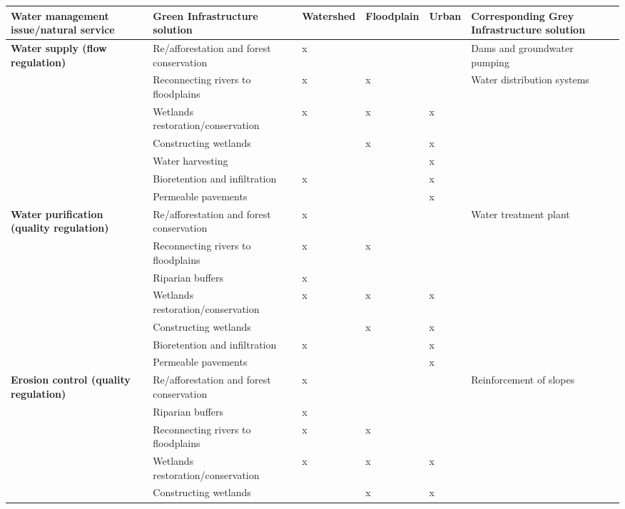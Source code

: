 \documentclass[./main.tex]{subfiles}
\begin{document}
{\renewcommand{\arraystretch}{1.5}
\begin{table}[t!]
    \centering	
    \tiny
    \sffamily
    \begin{tabular}{ 
 >{\raggedright\arraybackslash}m{2.5cm}  
 >{\raggedright\arraybackslash}m{3.5cm}  
 >{\raggedright\arraybackslash}m{1.0cm}
 >{\raggedright\arraybackslash}m{1.0cm}
 >{\raggedright\arraybackslash}m{1.0cm}
 >{\raggedright\arraybackslash}m{2.5cm}}
    \toprule 
    \textbf{Water management issue/natural service} & \textbf{Green Infrastructure solution} & \textbf{Watershed} & \textbf{Floodplain} & \textbf{Urban} & \textbf{Corresponding Grey Infrastructure solution}\\ 
    \midrule
    \textbf{Water supply (flow regulation)} & Re/afforestation and forest conservation & x &  &  & Dams and groundwater pumping \\
    \cline{2-5}
    & Reconnecting rivers to floodplains & x & x &  & Water distribution systems \\
    \cline{2-5}
    & Wetlands restoration/conservation & x & x & x &  \\
    \cline{2-5}
    & Constructing wetlands &  & x & x &  \\
    \cline{2-5}
    & Water harvesting &  &  & x &  \\
    \cline{2-5}
    & Bioretention and infiltration & x &  & x &  \\
    \cline{2-5}
    & Permeable pavements &  &  & x &  \\
    
    \textbf{Water purification (quality regulation)}& Re/afforestation and forest conservation & x &  &  & Water treatment plant \\
    \cline{2-5}
    & Reconnecting rivers to floodplains & x & x &  &  \\
    \cline{2-5}
    & Riparian buffers & x &  &  &  \\
    \cline{2-5}
    & Wetlands restoration/conservation & x & x & x &  \\
    \cline{2-5}
    & Constructing wetlands &  & x & x &  \\
    \cline{2-5}
    & Bioretention and infiltration & x &  & x &  \\
    \cline{2-5}
    & Permeable pavements &  &  & x &  \\
    
    \textbf{Erosion control (quality regulation)}& Re/afforestation and forest conservation & x &  &  & Reinforcement of slopes \\
    \cline{2-5}
    & Riparian buffers & x &  &  &  \\
    \cline{2-5}
    & Reconnecting rivers to floodplains & x & x &  &  \\
    \cline{2-5}
    & Wetlands restoration/conservation & x & x & x &  \\
    \cline{2-5}
    & Constructing wetlands &  & x & x &  \\
    

\end{tabular}
\end{table}}
\end{document}
